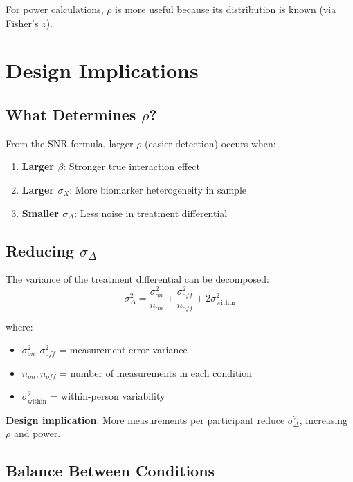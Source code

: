 \documentclass[11pt]{article}
\theoremstyle{definition}
\begin{document}
For power calculations, $\rho$ is more useful because its distribution
is known (via Fisher's $z$).

\section{Design Implications}

\subsection{What Determines $\rho$?}

From the SNR formula, larger $\rho$ (easier detection) occurs when:

\begin{enumerate}
    \item \textbf{Larger $\beta$}: Stronger true interaction effect
    \item \textbf{Larger $\sigma_X$}: More biomarker heterogeneity in sample
    \item \textbf{Smaller $\sigma_{\Delta}$}: Less noise in treatment differential
\end{enumerate}

\subsection{Reducing $\sigma_{\Delta}$}

The variance of the treatment differential can be decomposed:
\begin{equation}
\sigma_{\Delta}^2 = \frac{\sigma_{on}^2}{n_{on}} + \frac{\sigma_{off}^2}{n_{off}}
+ 2\sigma_{\text{within}}^2
\end{equation}

where:
\begin{itemize}
    \item $\sigma_{on}^2, \sigma_{off}^2$ = measurement error variance
    \item $n_{on}, n_{off}$ = number of measurements in each condition
    \item $\sigma_{\text{within}}^2$ = within-person variability
\end{itemize}

\textbf{Design implication}: More measurements per participant reduce
$\sigma_{\Delta}^2$, increasing $\rho$ and power.

\subsection{Balance Between Conditions}
\end{document}
